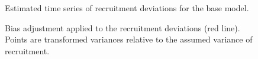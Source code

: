 \documentclass[
]{scrartcl}
\begin{document}
\begin{figure}[H]


\caption{\label{fig-recdevs}Estimated time series of recruitment
deviations for the base model.}

\end{figure}%

\begin{figure}[H]


\caption{\label{fig-biasramp}Bias adjustment applied to the recruitment
deviations (red line). Points are transformed variances relative to the
assumed variance of recruitment.}

\end{figure}%
\end{document}
